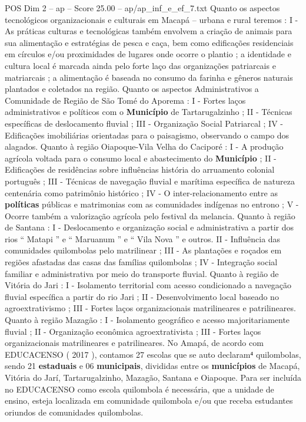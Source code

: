 \begin{textsample}{POS Dim 2 – ap – Score 25.00 – ap/ap\_inf\_e\_ef\_7.txt}
Quanto os aspectos tecnológicos organizacionais e culturais em Macapá – urbana e rural teremos : I - As práticas culturas e tecnológicas também envolvem a criação de animais para sua alimentação e estratégias de pesca e caça, bem como edificações residenciais em círculos e/ou proximidades de lugares onde ocorre o plantio ; a identidade e cultura local é marcada ainda pelo forte laço das organizações patriarcais e matriarcais ; a alimentação é baseada no consumo da farinha e gêneros naturais plantados e coletados na região.
Quanto os aspectos Administrativos a Comunidade de Região de São Tomé do Aporema : I - Fortes laços administrativos e políticos com o \textbf{Município} de Tartarugalzinho ; II - Técnicas específicas de deslocamento fluvial ; III - Organização Social Patriarcal ; IV - Edificações imobiliárias orientadas para o paisagismo, observando o campo dos alagados.
Quanto à região Oiapoque-Vila Velha do Caciporé : I - A produção agrícola voltada para o consumo local e abastecimento do \textbf{Município} ; II - Edificações de residências sobre influências história do arruamento colonial português ; III - Técnicas de navegação fluvial e marítima específica de natureza centenária como patrimônio histórico ; IV - O inter-relacionamento entre as \textbf{políticas} públicas e matrimonias com as comunidades indígenas no entrono ; V - Ocorre também a valorização agrícola pelo festival da melancia.
Quanto à região de Santana : I - Deslocamento e organização social e administrativa a partir dos rios “ Matapi ” e “ Maruanum ” e “ Vila Nova ” e outros.
II - Influência das comunidades quilombolas pelo matrilinear ; III - As plantações e roçados em regiões afastadas das casas das famílias quilombolas ; IV - Integração social familiar e administrativa por meio do transporte fluvial.
Quanto à região de Vitória do Jari : I - Isolamento territorial com acesso condicionado a navegação fluvial específica a partir do rio Jari ; II - Desenvolvimento local baseado no agroextrativismo ; III - Fortes laços organizacionais matrilineares e patrilineares.
Quanto à região Mazagão : I - Isolamento geográfico e acesso majoritariamente fluvial ; II - Organização econômica agroextrativista ; III - Fortes laços organizacionais matrilineares e patrilineares.
No Amapá, de acordo com EDUCACENSO ( 2017 ), contamos 27 escolas que se auto declaram⁴ quilombolas, sendo 21 \textbf{estaduais} e 06 \textbf{municipais}, divididas entre os \textbf{municípios} de Macapá, Vitória do Jarí, Tartarugalzinho, Mazagão, Santana e Oiapoque.
Para ser incluída no EDUCACENSO como escola quilombola é necessária, que a unidade de ensino, esteja localizada em comunidade quilombola e/ou que receba estudantes oriundos de comunidades quilombolas.

\end{textsample}
